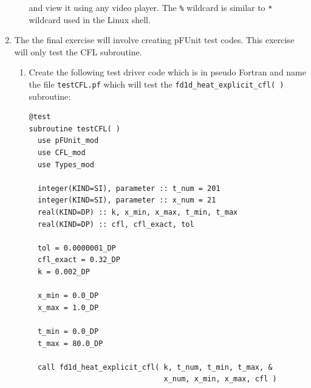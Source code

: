 \documentclass[12pt]{article}
\begin{document}
\begin{enumerate}
\begin{enumerate}
\begin{verbatim}
\end{verbatim}
and view it using any video player. The \texttt{\%} wildcard is similar to \texttt{*} wildcard used 
in the Linux shell. 
\end{enumerate}
\item The the final exercise will involve creating pFUnit test codes. This exercise will only
test the CFL subroutine. 
\begin{enumerate}
\item Create the following test driver code which is in pseudo Fortran and name the file \texttt{testCFL.pf} 
which will test the \texttt{fd1d\_heat\_explicit\_cfl( )} subroutine:
\begin{verbatim}
@test
subroutine testCFL( )
  use pFUnit_mod
  use CFL_mod
  use Types_mod

  integer(KIND=SI), parameter :: t_num = 201
  integer(KIND=SI), parameter :: x_num = 21
  real(KIND=DP) :: k, x_min, x_max, t_min, t_max 
  real(KIND=DP) :: cfl, cfl_exact, tol

  tol = 0.0000001_DP
  cfl_exact = 0.32_DP
  k = 0.002_DP

  x_min = 0.0_DP
  x_max = 1.0_DP

  t_min = 0.0_DP
  t_max = 80.0_DP
  
  call fd1d_heat_explicit_cfl( k, t_num, t_min, t_max, &
                               x_num, x_min, x_max, cfl )


\end{verbatim}
\end{enumerate}
\end{enumerate}
\end{document}
